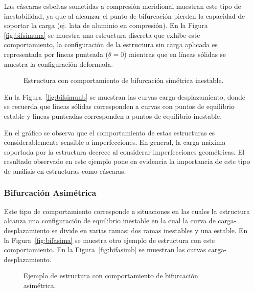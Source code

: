 Las cáscaras esbeltas sometidas a compresión meridional muestran este tipo de inestabilidad, ya que al alcanzar el punto de bifurcación pierden la capacidad de soportar la carga (ej. lata de aluminio en compresión). %
%
En la Figura \ref{fig:bifsimuna} se muestra una estructura discreta que exhibe este comportamiento, la configuración de la estructura sin carga aplicada es representada por líneas punteada ($\theta = 0$) mientras que en líneas sólidas se muestra la configuración deformada.

\begin{figure}[htb]
	\centering
		\centering
	\hspace{0.05\textwidth}
		\centering
	\caption{Estructura con comportamiento de bifurcación simétrica inestable.}
	\label{fig:fig11}
\end{figure}

En la Figura~\ref{fig:bifsimunb} se muestran las curvas carga-desplazamiento, donde se recuerda que líneas sólidas corresponden a curvas con puntos de equilibrio estable y lìneas punteadas corresponden a puntos de equilibrio inestable. %

En el gráfico se observa que el comportamiento de estas estructuras es considerablemente sensible a imperfecciones. En general, la carga máxima soportada por la estructura decrece al considerar imperfecciones geométricas. %
%
El resultado observado en este ejemplo pone en evidencia la importancia de este tipo de análisis en estructuras como cáscaras.
%

\subsubsection{Bifurcación Asimétrica}

Este tipo de comportamiento corresponde a situaciones en las cuales la estructura alcanza una configuración de equilibrio inestable en la cual la curva de carga-desplazamiento se divide en varias ramas: dos ramas inestables y una estable. %
%
En la Figura~\ref{fig:bifasima} se muestra otro ejemplo de estructura con este comportamiento. %
%
En la Figura~\ref{fig:bifasimb} se muestran las curvas carga-desplazamiento.

\begin{figure}[htb]
	\centering
	\hspace{0.005\textwidth}
	\caption{Ejemplo de estructura con comportamiento de bifurcación asimétrica.}
	\label{fig:fig12}
\end{figure}

